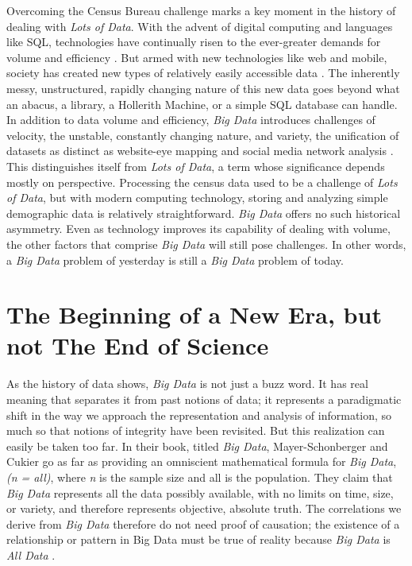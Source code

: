 \documentclass[sigconf]{acmart}
\begin{document}
	Overcoming the Census Bureau challenge marks a key moment in the history of dealing with {\em Lots of Data}. With the advent of digital computing and languages like SQL, technologies have continually risen to the ever-greater demands for volume and efficiency \cite{Rand}. But armed with new technologies like web and mobile, society has created new types of relatively easily accessible data \cite{Data-History}. The inherently messy, unstructured, rapidly changing nature of this new data goes beyond what an abacus, a library, a Hollerith Machine, or a simple SQL database can handle. In addition to data volume and efficiency, {\em Big Data} introduces challenges of velocity, the unstable, constantly changing nature, and variety, the unification of datasets as distinct as website-eye mapping and social media network analysis \cite{3Vs}. This distinguishes itself from {\em Lots of Data}, a term whose significance depends mostly on perspective. Processing the census data used to be a challenge of {\em Lots of Data}, but with modern computing technology, storing and analyzing simple demographic data is relatively straightforward. {\em Big Data} offers no such historical asymmetry. Even as technology improves its capability of dealing with volume, the other factors that comprise {\em Big Data} will still pose challenges. In other words, a {\em Big Data} problem of yesterday is still a {\em Big Data} problem of today.

\section{The Beginning of a New Era, but not The End of Science}
As the history of data shows, {\em Big Data} is not just a buzz word. It has real meaning that separates it from past notions of data; it represents a paradigmatic shift in the way we approach the representation and analysis of information, so much so that notions of integrity have been revisited. But this realization can easily be taken too far. In their book, titled {\em Big Data}, Mayer-Schonberger and Cukier go as far as providing an omniscient mathematical formula for {\em Big Data}, {\em (n = all)}, where {\em n} is the sample size and all is the population.  They claim that {\em Big Data} represents all the data possibly available, with no limits on time, size, or variety, and therefore represents objective, absolute truth. The correlations we derive from {\em Big Data} therefore do not need proof of causation; the existence of a relationship or pattern in Big Data must be true of reality because {\em Big Data} is {\em All Data} \cite{Keystone}.
\end{document}
